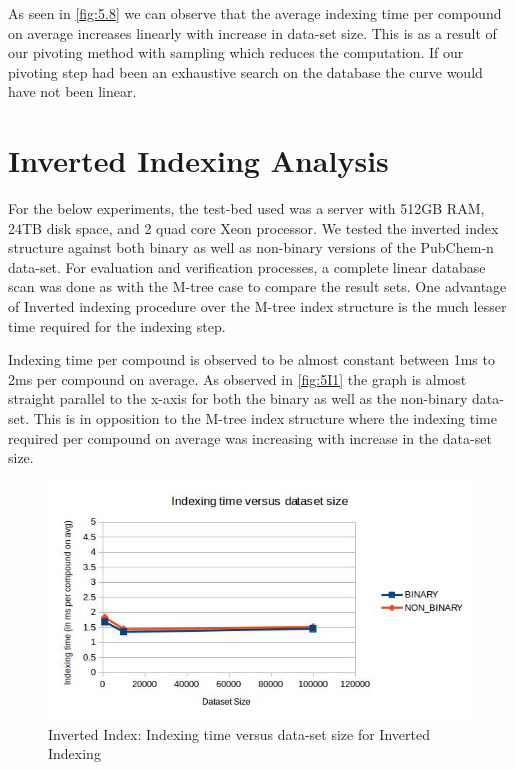 As seen in \autoref{fig:5.8} we can observe that the average indexing time per compound on average increases linearly with increase in data-set size. This is as a result of our pivoting method with sampling which reduces the computation. If our pivoting step had been an exhaustive search on the database the curve would have not been linear. 





\section{Inverted Indexing Analysis}

For the below experiments, the test-bed used was a server with 512GB RAM, 24TB disk space, and 2 quad core Xeon processor. We tested the inverted index structure against both binary as well as non-binary versions of the PubChem-n data-set. For evaluation and verification processes, a complete linear database scan was done as with the M-tree case to compare the result sets. One advantage of Inverted indexing procedure over the M-tree index structure is the much lesser time required for the indexing step. 

Indexing time per compound is observed to be almost constant between 1ms to 2ms per compound on average. As observed in \autoref{fig:5I1} the graph is almost straight parallel to the x-axis for both the binary as well as the non-binary data-set. This is in opposition to the M-tree index structure where the indexing time required per compound on average was increasing with increase in the data-set size. 


\begin{figure}[ht]	
\centering
\includegraphics[width=1 \columnwidth]{img/imageI1.jpg}
\caption{Inverted Index: Indexing time versus data-set size for Inverted Indexing}
\label{fig:5I1}
\end{figure}


